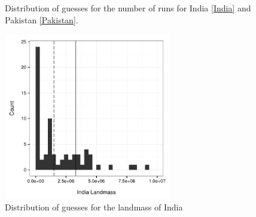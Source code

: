 \documentclass{article}
\begin{document}
\begin{figure}[ht!]
     \begin{center}
    \end{center}
    \caption{Distribution of guesses for the number of runs for India \ref{India} and Pakistan \ref{Pakistan}.}
\end{figure}


\begin{figure}
\begin{center}
\includegraphics[width=0.65\textwidth]{../../output/inClass_exp/india.pdf}
\caption{Distribution of guesses for the landmass of India}
\label{pareto}
\end{center}	
\end{figure}
\end{document}
